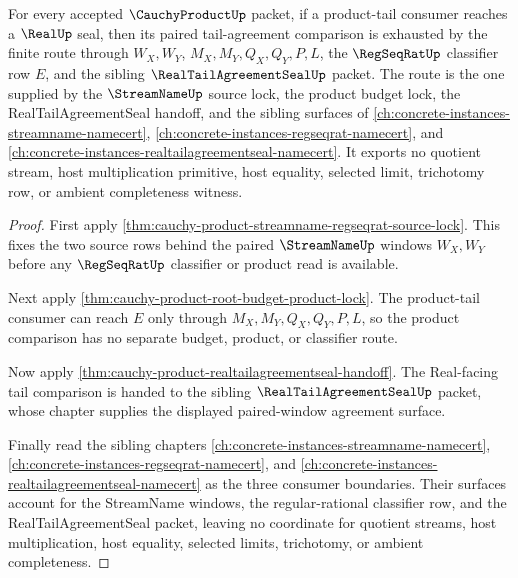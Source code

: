 \begin{theorem}
\label{thm:cauchy-product-paired-window-tail-agreement-exhaustion}
For every accepted $\CauchyProductUp$ packet, if a product-tail consumer reaches a $\RealUp$ seal, then its paired tail-agreement comparison is exhausted by the finite route through $W_X,W_Y$, $M_X,M_Y,Q_X,Q_Y,P,L$, the $\RegSeqRatUp$ classifier row $E$, and the sibling $\RealTailAgreementSealUp$ packet. The route is the one supplied by the $\StreamNameUp$ source lock, the product budget lock, the RealTailAgreementSeal handoff, and the sibling surfaces of \autoref{ch:concrete-instances-streamname-namecert}, \autoref{ch:concrete-instances-regseqrat-namecert}, and \autoref{ch:concrete-instances-realtailagreementseal-namecert}. It exports no quotient stream, host multiplication primitive, host equality, selected limit, trichotomy row, or ambient completeness witness.
\end{theorem}
\begin{proof}
First apply \autoref{thm:cauchy-product-streamname-regseqrat-source-lock}. This fixes the two source rows behind the paired $\StreamNameUp$ windows $W_X,W_Y$ before any $\RegSeqRatUp$ classifier or product read is available.

Next apply \autoref{thm:cauchy-product-root-budget-product-lock}. The product-tail consumer can reach $E$ only through $M_X,M_Y,Q_X,Q_Y,P,L$, so the product comparison has no separate budget, product, or classifier route.

Now apply \autoref{thm:cauchy-product-realtailagreementseal-handoff}. The Real-facing tail comparison is handed to the sibling $\RealTailAgreementSealUp$ packet, whose chapter supplies the displayed paired-window agreement surface.

Finally read the sibling chapters \autoref{ch:concrete-instances-streamname-namecert}, \autoref{ch:concrete-instances-regseqrat-namecert}, and \autoref{ch:concrete-instances-realtailagreementseal-namecert} as the three consumer boundaries. Their surfaces account for the StreamName windows, the regular-rational classifier row, and the RealTailAgreementSeal packet, leaving no coordinate for quotient streams, host multiplication, host equality, selected limits, trichotomy, or ambient completeness.
\end{proof}

